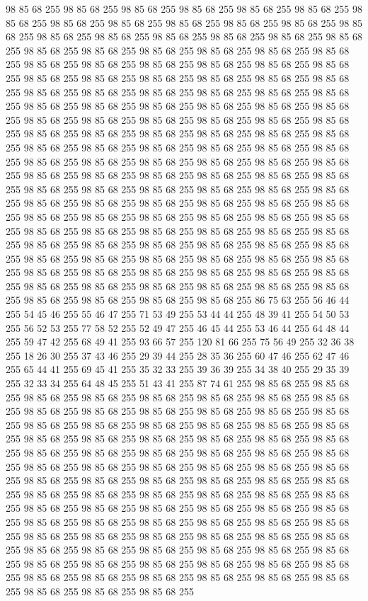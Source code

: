 98 85 68 255 98 85 68 255 98 85 68 255 98 85 68 255 98 85 68 255 98 85 68 255 98 85 68 255 98 85 68 255 98 85 68 255 98 85 68 255 98 85 68 255 98 85 68 255 98 85 68 255 98 85 68 255 98 85 68 255 98 85 68 255 98 85 68 255 98 85 68 255 98 85 68 255 98 85 68 255 98 85 68 255 98 85 68 255 98 85 68 255 98 85 68 255 98 85 68 255 98 85 68 255 98 85 68 255 98 85 68 255 98 85 68 255 98 85 68 255 98 85 68 255 98 85 68 255 98 85 68 255 98 85 68 255 98 85 68 255 98 85 68 255 98 85 68 255 98 85 68 255 98 85 68 255 98 85 68 255 98 85 68 255 98 85 68 255 98 85 68 255 98 85 68 255 98 85 68 255 98 85 68 255 98 85 68 255 98 85 68 255 98 85 68 255 98 85 68 255 98 85 68 255 98 85 68 255 98 85 68 255 98 85 68 255 98 85 68 255 98 85 68 255 98 85 68 255 98 85 68 255 98 85 68 255 98 85 68 255 98 85 68 255 98 85 68 255 98 85 68 255 98 85 68 255
98 85 68 255 98 85 68 255 98 85 68 255 98 85 68 255 98 85 68 255 98 85 68 255 98 85 68 255 98 85 68 255 98 85 68 255 98 85 68 255 98 85 68 255 98 85 68 255 98 85 68 255 98 85 68 255 98 85 68 255 98 85 68 255 98 85 68 255 98 85 68 255 98 85 68 255 98 85 68 255 98 85 68 255 98 85 68 255 98 85 68 255 98 85 68 255 98 85 68 255 98 85 68 255 98 85 68 255 98 85 68 255 98 85 68 255 98 85 68 255 98 85 68 255 98 85 68 255 98 85 68 255 98 85 68 255 98 85 68 255 98 85 68 255 98 85 68 255 98 85 68 255 98 85 68 255 98 85 68 255 98 85 68 255 98 85 68 255 98 85 68 255 98 85 68 255 98 85 68 255 98 85 68 255 98 85 68 255 98 85 68 255 98 85 68 255 98 85 68 255 98 85 68 255 98 85 68 255 98 85 68 255 98 85 68 255 98 85 68 255 98 85 68 255 98 85 68 255 98 85 68 255 98 85 68 255 98 85 68 255 98 85 68 255 98 85 68 255 98 85 68 255 98 85 68 255
98 85 68 255 98 85 68 255 98 85 68 255 86 75 63 255 56 46 44 255 54 45 46 255 55 46 47 255 71 53 49 255 53 44 44 255 48 39 41 255 54 50 53 255 56 52 53 255 77 58 52 255 52 49 47 255 46 45 44 255 53 46 44 255 64 48 44 255 59 47 42 255 68 49 41 255 93 66 57 255 120 81 66 255 75 56 49 255 32 36 38 255 18 26 30 255 37 43 46 255 29 39 44 255 28 35 36 255 60 47 46 255 62 47 46 255 65 44 41 255 69 45 41 255 35 32 33 255 39 36 39 255 34 38 40 255 29 35 39 255 32 33 34 255 64 48 45 255 51 43 41 255 87 74 61 255 98 85 68 255 98 85 68 255 98 85 68 255 98 85 68 255 98 85 68 255 98 85 68 255 98 85 68 255 98 85 68 255 98 85 68 255 98 85 68 255 98 85 68 255 98 85 68 255 98 85 68 255 98 85 68 255 98 85 68 255 98 85 68 255 98 85 68 255 98 85 68 255 98 85 68 255 98 85 68 255 98 85 68 255 98 85 68 255 98 85 68 255 98 85 68 255 98 85 68 255
98 85 68 255 98 85 68 255 98 85 68 255 98 85 68 255 98 85 68 255 98 85 68 255 98 85 68 255 98 85 68 255 98 85 68 255 98 85 68 255 98 85 68 255 98 85 68 255 98 85 68 255 98 85 68 255 98 85 68 255 98 85 68 255 98 85 68 255 98 85 68 255 98 85 68 255 98 85 68 255 98 85 68 255 98 85 68 255 98 85 68 255 98 85 68 255 98 85 68 255 98 85 68 255 98 85 68 255 98 85 68 255 98 85 68 255 98 85 68 255 98 85 68 255 98 85 68 255 98 85 68 255 98 85 68 255 98 85 68 255 98 85 68 255 98 85 68 255 98 85 68 255 98 85 68 255 98 85 68 255 98 85 68 255 98 85 68 255 98 85 68 255 98 85 68 255 98 85 68 255 98 85 68 255 98 85 68 255 98 85 68 255 98 85 68 255 98 85 68 255 98 85 68 255 98 85 68 255 98 85 68 255 98 85 68 255 98 85 68 255 98 85 68 255 98 85 68 255 98 85 68 255 98 85 68 255 98 85 68 255 98 85 68 255 98 85 68 255 98 85 68 255 98 85 68 255
